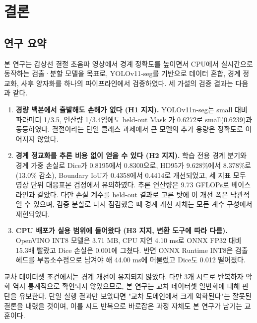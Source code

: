 \chapter{결론}\label{ch:conclusion}

\section{연구 요약}

본 연구는 갑상선 결절 초음파 영상에서 경계 정확도를 높이면서 CPU에서 실시간으로 동작하는 검출·분할
모델을 목표로, YOLOv11-seg를 기반으로 데이터 혼합, 경계 정교화, 사후 양자화를 하나의 파이프라인에서
검증하였다. 세 가설의 검증 결과는 다음과 같다.

\begin{enumerate}
  \item \textbf{경량 백본에서 출발해도 손해가 없다 (H1 지지).} YOLOv11n-seg는 small 대비 파라미터 1/3.5,
    연산량 1/3.4임에도 held-out Mask \mAP{}가 0.6272로 small(0.6239)과 동등하였다. 결절이라는 단일
    클래스 과제에서 큰 모델의 추가 용량은 정확도로 이어지지 않았다.

  \item \textbf{경계 정교화를 추론 비용 없이 얻을 수 있다 (H2 지지).} 학습 전용 경계 분기와 경계 가중 손실로
    Dice가 0.8195에서 0.8300으로, HD95가 9.628\%에서 8.378\%로(13.0\% 감소), Boundary IoU가 0.4358에서
    0.4414로 개선되었고, 세 지표 모두 영상 단위 대응표본 검정에서 유의하였다. 추론 연산량은 9.73 GFLOPs로
    베이스라인과 같았다. 다만 손실 계수를 held-out 결과로 고른 탓에 이 개선 폭은 낙관적일 수 있으며,
    검증 분할로 다시 점검했을 때 경계 개선 자체는 모든 계수 구성에서 재현되었다.

  \item \textbf{CPU 배포가 실용 범위에 들어왔다 (H3 지지, 변환 도구에 따라 다름).} OpenVINO INT8 모델은 3.71 MB,
    CPU 지연 4.10 ms로 ONNX FP32 대비 15.3배 빨랐고 Dice 손실은 0.001에 그쳤다. 반면 ONNX Runtime INT8은
    검출 헤드를 부동소수점으로 남겨야 해 44.00 ms에 머물렀고 Dice도 0.012 떨어졌다.
\end{enumerate}

교차 데이터셋 조건에서는 경계 개선이 유지되지 않았다. 다만 3개 시드로 반복하자 악화 역시 통계적으로
확인되지 않았으므로, 본 연구는 교차 데이터셋 일반화에 대해 판단을 유보한다. 단일 실행 결과만 보았다면
"교차 도메인에서 크게 악화된다"는 잘못된 결론을 내렸을 것이며, 이를 시드 반복으로 바로잡은 과정 자체도
본 연구가 남기는 교훈이다.

